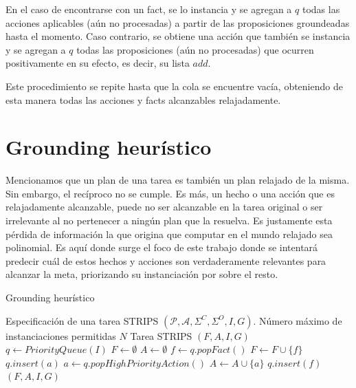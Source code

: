 En el caso de encontrarse con un fact, se lo instancia y se agregan a $q$ todas
las acciones aplicables (aún no procesadas) a partir de las proposiciones
groundeadas hasta el momento. Caso contrario, se obtiene una acción que también
se instancia y se agregan a $q$ todas las proposiciones (aún no procesadas) que
ocurren positivamente en su efecto, es decir, su lista $add$.

Este procedimiento se repite hasta que la cola se encuentre vacía, obteniendo de
esta manera todas las acciones y facts alcanzables relajadamente.

\section{Grounding heurístico}
\label{lit:heuristic_grounding}

Mencionamos que un plan de una tarea es también un plan relajado de la misma.
Sin embargo, el recíproco no se cumple. Es más, un hecho o una acción que es
relajadamente alcanzable, puede no ser alcanzable en la tarea original o ser
irrelevante al no pertenecer a ningún plan que la resuelva. Es justamente esta
pérdida de información la que origina que computar en el mundo relajado sea
polinomial. Es aquí donde surge el foco de este trabajo donde se intentará
predecir cuál de estos hechos y acciones son verdaderamente relevantes para
alcanzar la meta, priorizando su instanciación por sobre el resto.

\begin{algorithm}
    \caption{Grounding heurístico}\label{alg:grounding-heuristico}
    \begin{algorithmic}[1]
    \Require Especificación de una tarea STRIPS $(\mathcal{P}, \mathcal{A},
    \Sigma^{C}, \Sigma^{O}, I, G)$. Número máximo de instanciaciones permitidas
    $N$ \Ensure Tarea STRIPS $(F, A, I, G)$ \State $q \gets PriorityQueue(I)$
    \State $F \gets \emptyset$ \State $A \gets \emptyset$     
     \State $f \gets q.popFact()$ \State $F \gets F \cup
        \{f\}$  \State $q.insert(a)$
        \EndFor \Else \State $a \gets q.popHighPriorityAction()$ \State $A \gets
        A \cup \{a\}$  \State $q.insert(f)$
        \EndFor \EndIf \EndWhile \State \Return $(F, A, I, G)$
    \end{algorithmic}
\end{algorithm}

